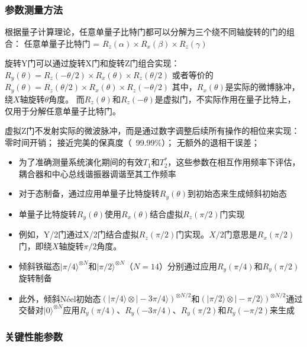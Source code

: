 \documentclass[11pt,a4paper]{article}
\begin{document}
\subsubsection{参数测量方法}
根据量子计算理论，任意单量子比特门都可以分解为三个绕不同轴旋转的门的组合：
任意单量子比特门 = $R_z(\alpha) \times R_x(\beta) \times R_z(\gamma)$

旋转Y门可以通过旋转X门和旋转Z门组合实现：
$R_y(\theta) = R_z(-\theta/2) \times R_x(\theta) \times R_z(\theta/2)$
或者等价的
$R_y(\theta) = R_z(\theta/2) \times R_x(\theta) \times R_z(-\theta/2)$
其中，$R_x(\theta)$是实际的微博脉冲，绕$X$轴旋转$\theta$角度。
而$R_z(\theta)$和$R_z(-\theta)$是虚拟门，不实际作用在量子比特上，仅用于分解任意单量子比特门。

虚拟Z门不发射实际的微波脉冲，而是通过数字调整后续所有操作的相位来实现：零时间开销；
接近完美的保真度（~99.99\%）；
无额外的退相干误差；


\begin{itemize}
    \item 为了准确测量系统演化期间的有效$T_1$和$T_2^*$，这些参数在相互作用频率下评估，耦合器和中心总线谐振器调谐至其工作频率
    \item 对于态制备，通过应用单量子比特旋转$R_y(\theta)$到初始态来生成倾斜初始态
    \item 单量子比特旋转$R_y(\theta)$使用$R_x(\theta)$结合虚拟$R_z(\pi/2)$门实现
    \item 例如，Y/2门通过X/2门结合虚拟$R_z(\pi/2)$门实现。$X/2$门意思是$R_x(\pi/2)$门，即绕$X$轴旋转$\pi/2$角度。
    \item 倾斜铁磁态$|\pi/4\rangle^{\otimes N}$和$|\pi/2\rangle^{\otimes N}$（$N=14$）分别通过应用$R_y(\pi/4)$和$R_y(\pi/2)$旋转制备
    \item 此外，倾斜Néel初始态$(|\pi/4\rangle\otimes|-3\pi/4\rangle)^{\otimes N/2}$和$(|\pi/2\rangle\otimes|-\pi/2\rangle)^{\otimes N/2}$通过交替对$|0\rangle^{\otimes N}$应用$R_y(\pi/4)$、$R_y(-3\pi/4)$、$R_y(\pi/2)$和$R_y(-\pi/2)$来生成
\end{itemize}

\subsubsection{关键性能参数}
\end{document}
